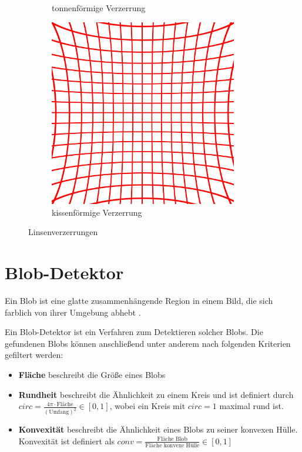 \begin{figure}[!htb]
\begin{subfigure}{.33\textwidth}
		\caption{tonnenförmige Verzerrung}
		\label{fig:barrel}
	\end{subfigure}%
	\begin{subfigure}{.33\textwidth}
		\centering
		\includegraphics[width=0.9\textwidth]{images/cushionDistortion.png}
		\caption{kissenförmige Verzerrung}
		\label{fig:cushion}
	\end{subfigure}
	\caption{Linsenverzerrungen}
	\label{fig:distortion}
\end{figure}



\section{Blob-Detektor}
\label{s:blob}
\begin{definition}[Blob]\label{def:blob}
	Ein Blob ist eine glatte zusammenhängende Region in einem Bild, die sich farblich von ihrer Umgebung abhebt \cite{Lindeberg1993}.
\end{definition}

Ein Blob-Detektor ist ein Verfahren zum Detektieren solcher Blobs. Die gefundenen Blobs können anschließend unter anderem nach folgenden Kriterien gefiltert werden:
\begin{itemize}
	\item \textbf{Fläche} beschreibt die Größe eines Blobs
	\item \textbf{Rundheit} beschreibt die Ähnlichkeit zu einem Kreis und ist definiert durch $circ = \frac{4\pi\cdot \textrm{Fläche}}{\left(\textrm{Umfang}\right)^2}\in[0,1]$, wobei ein Kreis mit $circ = 1$ maximal rund ist.
	\item  \textbf{Konvexität} beschreibt die Ähnlichkeit eines Blobs zu seiner konvexen Hülle. Konvexität ist definiert als $conv = \frac{\textrm{Fläche Blob}}{\textrm{Fläche konvexe Hülle}}\in[0,1]$
\end{itemize}

